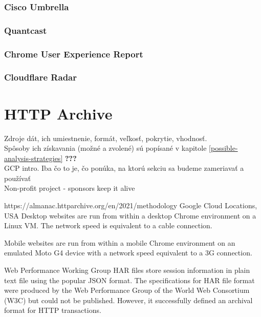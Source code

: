 \subsubsection{Cisco Umbrella}

\subsubsection{Quantcast}

\subsubsection{Chrome User Experience Report}

\subsubsection{Cloudflare Radar}




\section{HTTP Archive}

Zdroje dát, ich umiestnenie, formát, veľkosť, pokrytie, vhodnosť.
\\
Spôsoby ich získavania (možné a zvolené) sú popísané v kapitole \ref{possible-analysis-strategies} \textbf{???}
\\
GCP intro. Iba čo to je, čo ponúka, na ktorú sekciu sa budeme zameriavať a používať
\\
Non-profit project - sponsors keep it alive

https://almanac.httparchive.org/en/2021/methodology
Google Cloud Locations, USA
Desktop websites are run from within a desktop Chrome environment on a Linux VM. The network speed is equivalent to a cable connection.

Mobile websites are run from within a mobile Chrome environment on an emulated Moto G4 device with a network speed equivalent to a 3G connection.

Web Performance Working Group
HAR files store session information in plain text file using the popular JSON format. The specifications for HAR file format were produced by the Web Performance Group of the World Web Consortium (W3C) but could not be published. However, it successfully defined an archival format for HTTP transactions.

